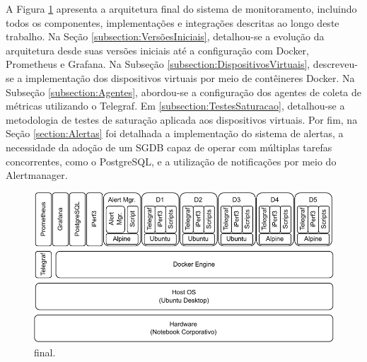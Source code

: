 {\color{red}
A Figura \ref{fig:StackFinal} apresenta a arquitetura final do sistema de monitoramento, incluindo todos os componentes, implementações e integrações descritas ao longo deste trabalho. Na Seção \ref{subsection:VersõesIniciais}, detalhou-se a evolução da arquitetura desde suas versões iniciais até a configuração com Docker, Prometheus e Grafana. Na Subseção \ref{subsection:DispositivosVirtuais}, descreveu-se a implementação dos dispositivos virtuais por meio de contêineres Docker. Na Subseção \ref{subsection:Agentes}, abordou-se a configuração dos agentes de coleta de métricas utilizando o Telegraf. Em \ref{subsection:TestesSaturacao}, detalhou-se a metodologia de testes de saturação aplicada aos dispositivos virtuais. Por fim, na Seção \ref{section:Alertas} foi detalhada a implementação do sistema de alertas, a necessidade da adoção de um SGDB capaz de operar com múltiplas tarefas concorrentes, como o PostgreSQL, e a utilização de notificações por meio do Alertmanager.}

\begin{figure}[H]
\centering
\setlength{\abovecaptionskip}{-20pt}
\includegraphics[width=\textwidth]{Imagens/chap04/final_stack.pdf}
\caption{ final.}
\label{fig:StackFinal}
\end{figure}


